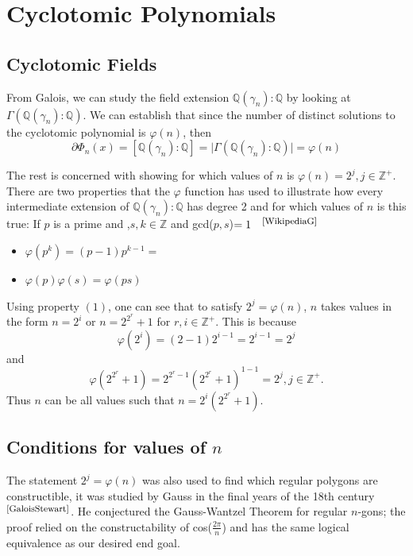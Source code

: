 \documentclass{article}
\begin{document}
\section{Cyclotomic Polynomials}
\subsection{Cyclotomic Fields}
From Galois, we can study the field extension $\mathbb{Q}(\gamma_n) : \mathbb{Q}$ by looking at $\Gamma(\mathbb{Q}(\gamma_n) : \mathbb{Q})$. We can establish that since the number of distinct solutions to the cyclotomic polynomial is $\varphi(n)$, then $$\partial \Phi_n(x) = [\mathbb{Q}(\gamma_n) : \mathbb{Q}] = \mid \Gamma(\mathbb{Q}(\gamma_n): \mathbb{Q}) \mid = \varphi(n)$$

The rest is concerned with showing for which values of $n$ is $\varphi(n) = 2^j,j\in\mathbb{Z}^{+}$. There are two properties that the $\varphi$ function has used to illustrate how every intermediate extension of $\mathbb{Q}(\gamma_n): \mathbb{Q}$ has degree 2 and for which values of $n$ is this true: If $p$ is a prime and ,$s,k \in \mathbb{Z}$ and gcd($p,s$)$= 1 \quad ^{\textrm{\footnotesize\cite{WikipediaG}}}$
    \begin{itemize}
        \item[(1)] $\varphi(p^k) = (p-1)p^{k-1} = $
        \item [(2)] $\varphi(p)\varphi(s) = \varphi(ps)$
    \end{itemize}

Using property $(1)$, one can see that to satisfy $2^j = \varphi(n)$, $n$ takes values in the form $ n = 2^i$ or $n = 2^{2^r} +1$ for $r,i \in \mathbb{Z}^+$. This is because 
$$\varphi(2^i) = (2 - 1)2^{i-1} = 2 ^ {i-1} = 2^j$$  and
$$\varphi(2^{2^r} +1) = 2^{2^r-1}(2^{2^r} +1)^{1-1} = 2^j, j\in\mathbb{Z}^+.$$ Thus $n$ can be all values such that $n = 2^i (2^{2^r} +1)$.

\subsection{Conditions for values of $n$}

The statement $2^j = \varphi(n)$ was also used to find which regular polygons are constructible, it was studied by Gauss in the final years of the 18th century $^{\textrm{\footnotesize\cite{GaloisStewart}}}$. He conjectured the Gauss-Wantzel Theorem for regular $n$-gons; the proof relied on the constructability of cos($\frac{2\pi}{n}$) and has the same logical equivalence as our desired end goal. 
\end{document}
